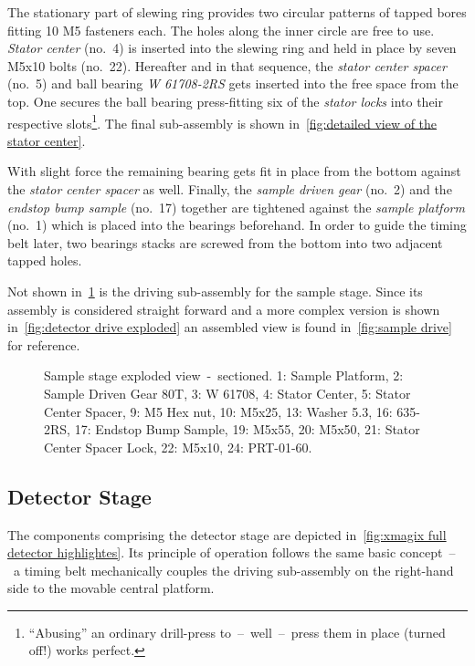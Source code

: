             The stationary part of slewing ring provides two circular patterns of tapped bores fitting 10 M5 fasteners each.
            The holes along the inner circle are free to use.
            \textit{Stator center} (no.~4) is inserted into the slewing ring and held in place by seven M5x10 bolts (no.~22).
            Hereafter and in that sequence, the \textit{stator center spacer} (no.~5) and ball bearing \textit{W 61708-2RS} gets inserted into the free space from the top.
            One secures the ball bearing press-fitting six of the \textit{stator locks} into their respective slots\footnote{ ``Abusing'' an ordinary drill-press to~--~well~--~press them in place (turned off!) works perfect.}.
            The final sub-assembly is shown in~\cref{fig:detailed view of the stator center}.

            With slight force the remaining bearing gets fit in place from the bottom against the \textit{stator center spacer} as well.
            Finally, the \textit{sample driven gear} (no.~2) and the \textit{endstop bump sample} (no.~17) together are tightened against the \textit{sample platform} (no.~1) which is placed into the bearings beforehand.
            In order to guide the timing belt later, two bearings stacks are screwed from the bottom into two adjacent tapped holes.\par\medskip

            Not shown in~\cref{fig:sample stage exploded section} is the driving sub-assembly for the sample stage.
            Since its assembly is considered straight forward and a more complex version is shown in~\cref{fig:detector drive exploded} an assembled view is found in~\cref{fig:sample drive} for reference.

            \begin{figure}[!h]
                \centering
                \caption[Sample stage exploded view~-~sectioned]{Sample stage exploded view~-~sectioned. 1: Sample Platform, 2: Sample Driven Gear 80T, 3: W 61708, 4: Stator Center, 5: Stator Center Spacer, 9: M5 Hex nut, 10: M5x25, 13: Washer 5.3, 16: 635-2RS, 17: Endstop Bump Sample, 19: M5x55, 20: M5x50, 21: Stator Center Spacer Lock, 22: M5x10, 24: PRT-01-60.}%
                \label{fig:sample stage exploded section}%
            \end{figure}

        \subsection{Detector Stage}\label{sec:detector stage}
            The components comprising the detector stage are depicted in~\cref{fig:xmagix full detector highlightes}.
            Its principle of operation follows the same basic concept~--~a timing belt mechanically couples the driving sub-assembly on the right-hand side to the movable central platform.\par\medskip

